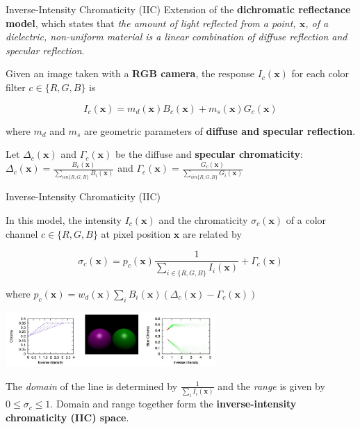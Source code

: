 \begin{tframe}{Inverse-Intensity Chromaticity (IIC)}
Extension of the \textbf{dichromatic reflectance model}, which states that \emph{the amount of light reflected from a point, $\textbf{x}$, of a dielectric, non-uniform material is a linear combination of diffuse reflection and specular reflection}.

\vspace{0.2cm}

Given an image taken with a \textbf{RGB camera}, the response $I_c(\textbf{x})$ for each color filter $c \in \{R, G, B\}$ is

$$
I_c(\textbf{x}) = m_d(\textbf{x})B_c(\textbf{x}) + m_s(\textbf{x})G_c(\textbf{x})
$$

\begin{small}
where $m_d$ and $m_s$ are geometric parameters of \textbf{diffuse and specular reflection}.
\vspace{0.2cm}

Let $\Delta_c(\textbf{x})$ and $\Gamma_c(\textbf{x})$ be the diffuse and \textbf{specular chromaticity}: $\Delta_c(\textbf{x}) = \frac{B_c(\textbf{x})}{\sum_{i in \{R, G, B\}} B_i(\textbf{x})}$ and $\Gamma_c(\textbf{x}) = \frac{G_c(\textbf{x})}{\sum_{i in \{R, G, B\}} G_i(\textbf{x})}$
\end{small}

\end{tframe}

\begin{tframe}{Inverse-Intensity Chromaticity (IIC)}

In this model, the intensity $I_c(\textbf{x})$ and the chromaticity $\sigma_c(\textbf{x})$ of a color channel $c \in \{R, G, B\}$ at pixel position $\textbf{x}$ are related by

\begin{equation}
\sigma_c(\textbf{x}) = p_c(\textbf{x}) \frac{1}{\sum_{i \in \{R, G, B\}} I_i(\textbf{x})} + \Gamma_c(\textbf{x})
\end{equation}
\vspace{0.2cm}

\begin{small}
where $p_c(\textbf{x}) = w_d(\textbf{x}) \sum_i B_i(\textbf{x}) (\Delta_c(\textbf{x}) - \Gamma_c(\textbf{x}))$ 
\end{small}

\begin{center}
\includegraphics[width=0.6\textwidth]{images/iic.jpg}
\end{center}
The \emph{domain} of the line is determined by $\frac{1}{\sum_i I_i(\textbf{x})}$ and the \emph{range} is given by $0 \leq \sigma_c \leq 1$. Domain and range together form the \textbf{inverse-intensity chromaticity (IIC) space}.
\end{tframe}


